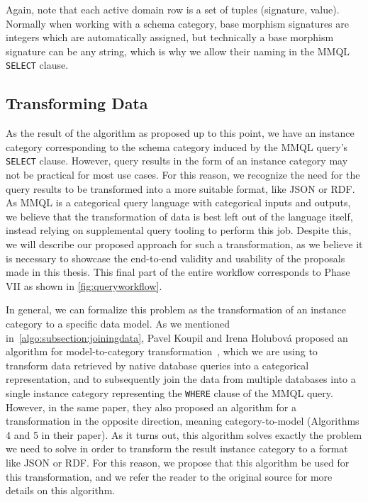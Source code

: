 Again, note that each active domain row is a set of tuples (signature, value).
Normally when working with a schema category, base morphism signatures are integers which are automatically assigned, but technically a base morphism signature can be any string, which is why we allow their naming in the MMQL \texttt{SELECT} clause.

\subsection{Transforming Data}
\label{algo:subsection:transform}

As the result of the algorithm as proposed up to this point, we have an instance category corresponding to the schema category induced by the MMQL query's \texttt{SELECT} clause.
However, query results in the form of an instance category may not be practical for most use cases.
For this reason, we recognize the need for the query results to be transformed into a more suitable format, like JSON or RDF.
As MMQL is a categorical query language with categorical inputs and outputs, we believe that the transformation of data is best left out of the language itself, instead relying on supplemental query tooling to perform this job.
Despite this, we will describe our proposed approach for such a transformation, as we believe it is necessary to showcase the end-to-end validity and usability of the proposals made in this thesis.
This final part of the entire workflow corresponds to Phase VII as shown in \cref{fig:queryworkflow}.

In general, we can formalize this problem as the transformation of an instance category to a specific data model.
As we mentioned in~\cref{algo:subsection:joiningdata}, Pavel Koupil and Irena Holubov{\'a} proposed an algorithm for model-to-category transformation~\cite{unified_representation}, which we are using to transform data retrieved by native database queries into a categorical representation, and to subsequently join the data from multiple databases into a single instance category representing the \texttt{WHERE} clause of the MMQL query.
However, in the same paper, they also proposed an algorithm for a transformation in the opposite direction, meaning category-to-model (Algorithms 4 and 5 in their paper).
As it turns out, this algorithm solves exactly the problem we need to solve in order to transform the result instance category to a format like JSON or RDF.
For this reason, we propose that this algorithm be used for this transformation, and we refer the reader to the original source for more details on this algorithm.

